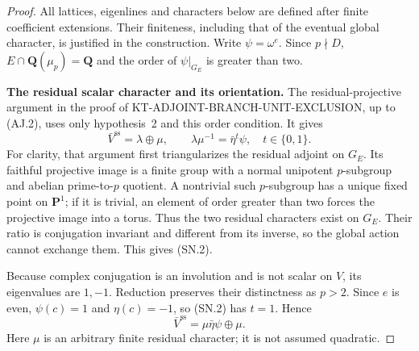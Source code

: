 \documentclass[11pt,a4paper]{article}
\theoremstyle{definition}
\renewcommand{\paragraph}[1]{\par\smallskip\noindent\textbf{#1}\quad\ignorespaces}
\begin{document}
\begin{proof}
All lattices, eigenlines and characters below are defined after
finite coefficient extensions.  Their finiteness, including that
of the eventual global character, is justified in the construction.
Write $\psi=\omega^e$.
Since $p\nmid D$, $E\cap\mathbf Q(\mu_p)=\mathbf Q$ and the order
of $\psi|_{G_E}$ is greater than two.

\paragraph{The residual scalar character and its orientation.}
The residual-projective argument in the proof of
KT-ADJOINT-BRANCH-UNIT-EXCLUSION, up to (AJ.2), uses only
hypothesis~2 and this order condition.  It gives
\[
 \bar V^{\mathrm{ss}}=\lambda\oplus\mu,
 \qquad \lambda\mu^{-1}=\bar\eta^t\psi,
 \quad t\in\{0,1\}.                                    \tag{SN.2}
\]
For clarity, that argument first triangularizes the residual
adjoint on $G_E$.  Its faithful projective image is a finite group
with a normal unipotent $p$-subgroup and abelian prime-to-$p$
quotient.  A nontrivial such $p$-subgroup has a unique fixed point
on $\mathbf P^1$; if it is trivial, an element of order greater
than two forces the projective image into a torus.  Thus the two
residual characters exist on $G_E$.  Their ratio is conjugation
invariant and different from its inverse, so the global action
cannot exchange them.  This gives (SN.2).

Because complex conjugation is an involution and is not scalar
on $V$, its eigenvalues are $1,-1$.  Reduction preserves their
distinctness as $p>2$.  Since $e$ is even, $\psi(c)=1$ and
$\eta(c)=-1$, so (SN.2) has $t=1$.  Hence
\[
          \bar V^{\mathrm{ss}}=\mu\bar\eta\psi\oplus\mu.
                                                               \tag{SN.3}
\]
Here $\mu$ is an arbitrary finite residual character; it is not
assumed quadratic.


\end{proof}
\end{document}
